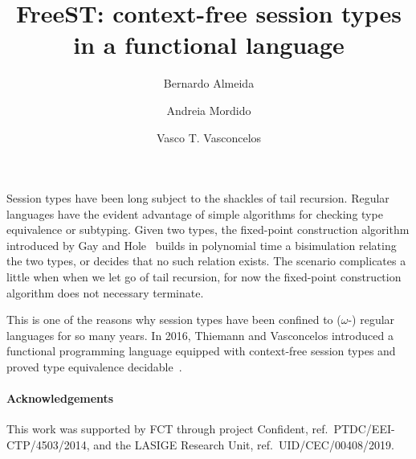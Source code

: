 \documentclass[submission,copyright,creativecommons]{eptcs}
\title{FreeST: context-free session types in a functional language}
\author{
  Bernardo Almeida
  \and
  Andreia Mordido
  \and
  Vasco T. Vasconcelos
  \institute{LASIGE, Faculdade de Ciências, Universidade de Lisboa, Portugal}
}
\begin{document}
\maketitle

Session types have been long subject to the shackles of tail
recursion. Regular languages have the evident advantage of simple
algorithms for checking type equivalence or subtyping. Given two
types, the fixed-point construction algorithm introduced by Gay and
Hole~\cite{DBLP:journals/acta/GayH05} builds in polynomial time a
bisimulation relating the two types, or decides that no such relation
exists. The scenario complicates a little when when we let go of tail
recursion, for now the fixed-point construction algorithm does not
necessary terminate.

This is one of the reasons why session types have been confined to
($\omega$-) regular languages for so many years. In 2016, Thiemann and
Vasconcelos introduced a functional programming language equipped with
context-free session types and proved type equivalence
decidable~\cite{DBLP:conf/icfp/ThiemannV16}.

\paragraph{Acknowledgements}

This work was supported by FCT through project Confident, ref.\
PTDC/EEI-CTP/4503/2014, and the LASIGE Research Unit, ref.\
UID/CEC/00408/2019.



\end{document}
